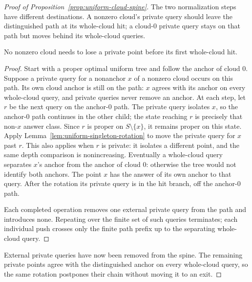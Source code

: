 \begin{proof}[Proof of Proposition~\ref{prop:uniform-cloud-spine}]
The two normalization steps have different destinations. A nonzero
cloud's private query should leave the distinguished path at its
whole-cloud hit; a cloud-$0$ private query stays on that path but
moves behind its whole-cloud queries.

\begin{claim}
\label{clm:uniform-cloud-external-private}
No nonzero cloud needs to lose a private point before its first whole-cloud hit.
\end{claim}
\begin{proof}
Start with a proper optimal uniform tree and follow the anchor
of cloud $0$. Suppose a private query for a nonanchor $x$ of a
nonzero cloud occurs on this path. Its own cloud anchor is still
on the path: $x$ agrees with its anchor on every whole-cloud query,
and private queries never remove an anchor.
At each step, let $r$ be the next query on the anchor-$0$ path.
The private query isolates $x$, so the anchor-$0$ path continues in
the other child; the state reaching $r$ is precisely that non-$x$
answer class. Since $r$ is proper on $S\setminus\{x\}$, it remains
proper on this state. Apply
Lemma~\ref{lem:uniform-singleton-rotation} to move the private query
for $x$ past $r$. This also applies when $r$ is private: it isolates
a different point, and the same depth comparison is nonincreasing.
Eventually a whole-cloud query separates $x$'s
anchor from the anchor of cloud $0$: otherwise the tree would
not identify both anchors. The point $x$ has the answer of its
own anchor to that query. After the rotation its private query
is in the hit branch, off the anchor-$0$ path.

Each completed operation removes one external private query from
the path and introduces none. Repeating over the finite set of such
queries terminates; each individual push crosses only the finite
path prefix up to the separating whole-cloud query.
\end{proof}
External private queries have now been removed from the spine.
The remaining private points agree with the distinguished anchor on
every whole-cloud query, so the same rotation postpones their chain
without moving it to an exit.


\end{proof}
